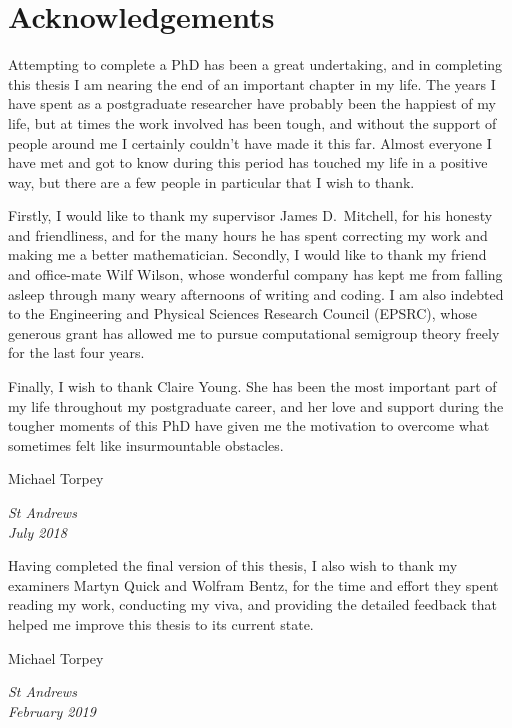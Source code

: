 \chapter*{Acknowledgements}

Attempting to complete a PhD has been a great undertaking, and in completing
this thesis I am nearing the end of an important chapter in my life.  The years
I have spent as a postgraduate researcher have probably been the happiest of my
life, but at times the work involved has been tough, and without the support of
people around me I certainly couldn't have made it this far.  Almost everyone I
have met and got to know during this period has touched my life in a positive
way, but there are a few people in particular that I wish to thank.

Firstly, I would like to thank my supervisor James D.~Mitchell, for his honesty
and friendliness, and for the many hours he has spent correcting my work and
making me a better mathematician.  Secondly, I would like to thank my friend and
office-mate Wilf Wilson, whose wonderful company has kept me from falling asleep
through many weary afternoons of writing and coding.  I am also indebted to the
Engineering and Physical Sciences Research Council (EPSRC), whose generous grant
has allowed me to pursue computational semigroup theory freely for the last four
years.

Finally, I wish to thank Claire Young.  She has been the most important part of
my life throughout my postgraduate career, and her love and support during the
tougher moments of this PhD have given me the motivation to overcome what
sometimes felt like insurmountable obstacles.

\begin{flushright}
  Michael Torpey

  \singlespacing
  \textit{St Andrews \\July 2018}
\end{flushright}

\vspace{2.0em}
\noindent
Having completed the final version of this thesis, I also wish to thank my
examiners Martyn Quick and Wolfram Bentz, for the time and effort they spent
reading my work, conducting my viva, and providing the detailed feedback that
helped me improve this thesis to its current state.

\begin{flushright}
  Michael Torpey

  \singlespacing
  \textit{St Andrews \\February 2019}
\end{flushright}
